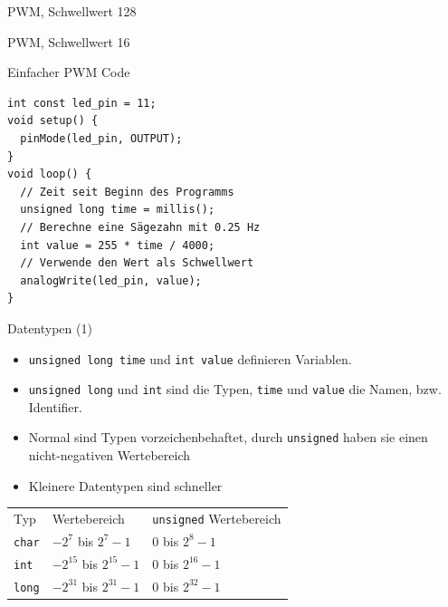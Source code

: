 \documentclass[bigger]{beamer}
\begin{document}
\begin{frame}[label={sec:org312d2b8}]{PWM, Schwellwert 128}
\end{frame}

\begin{frame}[label={sec:org0d6911a}]{PWM, Schwellwert 16}
\end{frame}

\begin{frame}[fragile,label={sec:org2e5c149}]{Einfacher PWM Code}
 \begin{verbatim}
int const led_pin = 11;
void setup() {
  pinMode(led_pin, OUTPUT);
}
void loop() {
  // Zeit seit Beginn des Programms
  unsigned long time = millis();
  // Berechne eine Sägezahn mit 0.25 Hz
  int value = 255 * time / 4000;
  // Verwende den Wert als Schwellwert
  analogWrite(led_pin, value);
}
\end{verbatim}
\end{frame}

\begin{frame}[fragile,label={sec:org51695f7}]{Datentypen (1)}
 \begin{itemize}
\item \texttt{unsigned long time} und \texttt{int value} definieren Variablen.
\item \texttt{unsigned long} und \texttt{int} sind die Typen, \texttt{time} und \texttt{value} die
Namen, bzw. Identifier.
\item Normal sind Typen vorzeichenbehaftet, durch \texttt{unsigned} haben sie
einen nicht-negativen Wertebereich
\item Kleinere Datentypen sind schneller
\end{itemize}

\begin{center}
\begin{tabular}{lll}
Typ & Wertebereich & \texttt{unsigned} Wertebereich\\
\texttt{char} & \(-2^7\)  bis \(2^7-1\) & 0 bis \(2^8-1\)\\
\texttt{int} & \(-2^{15}\) bis \(2^{15}-1\) & 0 bis \(2^{16}-1\)\\
\texttt{long} & \(-2^{31}\) bis \(2^{31}-1\) & 0 bis \(2^{32}-1\)\\
\end{tabular}
\end{center}
\end{frame}
\end{document}
